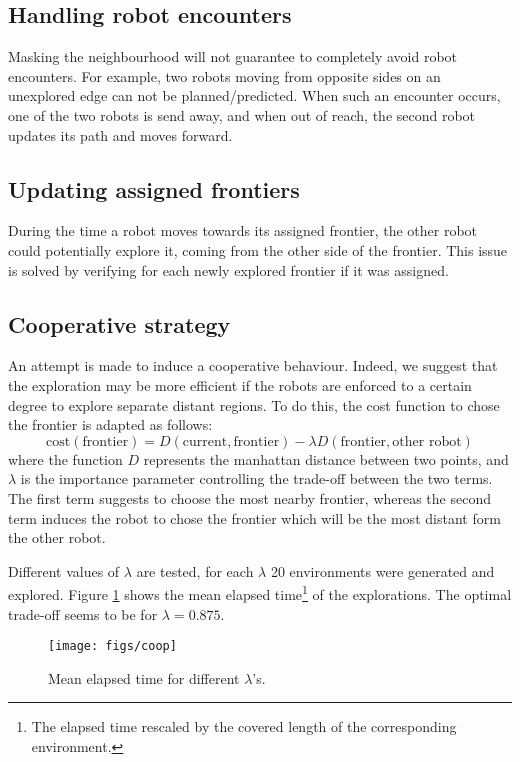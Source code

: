 \documentclass[12pt]{report}
\begin{document}
\subsection*{Handling robot encounters}
Masking the neighbourhood will not guarantee to completely avoid robot encounters. For example, two robots moving from opposite sides on an unexplored edge can not be planned/predicted. When such an encounter occurs, one of the two robots is send away, and when out of reach, the second robot updates its path and moves forward.

\subsection*{Updating assigned frontiers}
During the time a robot moves towards its assigned frontier, the other robot could potentially explore it, coming from the other side of the frontier. This issue is solved by verifying for each newly explored frontier if it was assigned.

\subsection*{Cooperative strategy}
An attempt is made to induce a cooperative behaviour. Indeed, we suggest that the exploration may be more efficient if the robots are enforced to a certain degree to explore separate distant regions. To do this, the cost function to chose the frontier is adapted as follows:
\begin{equation}
\text{cost}(\text{frontier}) = D(\text{current}, \text{frontier}) - \lambda D(\text{frontier}, \text{other robot})
\end{equation}
where the function $D$ represents the manhattan distance between two points, and $\lambda$ is the importance parameter controlling the trade-off between the two terms. The first term suggests to choose the most nearby frontier, whereas the second term induces the robot to chose the frontier which will be the most distant form the other robot.

Different values of $\lambda$ are tested, for each $\lambda$ 20 environments were generated and explored. Figure \ref{fig:coop} shows the mean elapsed time\footnote{The elapsed time rescaled by the covered length of the corresponding environment.} of the explorations. The optimal trade-off seems to be for $\lambda = 0.875$.
\begin{figure}[!h]
\centering
\texttt{[image: figs/coop]}
\caption{Mean elapsed time for different $\lambda$'s.}
\label{fig:coop}
\end{figure}
\end{document}
